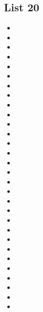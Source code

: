 \documentclass[a4paper,10pt]{article}
\begin{document}
\begin{CJK*}{UTF8}{gkai}
\section{List 20}
\begin{itemize}
\item 
\item 
\item 
\item 
\item 
\item 
\item 
\item 
\item 
\item 
\item 
\item 
\item 
\item 
\item 
\item 
\item 
\item 
\item 
\item 
\item 
\item 
\item 
\item 
\item 
\item 
\item 
\item 
\item 
\item 
\end{itemize}

\newpage

\end{CJK*}
\end{document}
